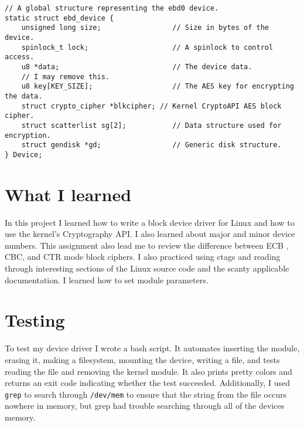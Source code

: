 \documentclass[10pt,conference,draftclsnofoot,onecolumn]{IEEEtran}
\begin{document}
\begin{lstlisting}
// A global structure representing the ebd0 device.
static struct ebd_device {
    unsigned long size;                 // Size in bytes of the device.
    spinlock_t lock;                    // A spinlock to control access.
    u8 *data;                           // The device data.
    // I may remove this.
    u8 key[KEY_SIZE];                   // The AES key for encrypting the data.
    struct crypto_cipher *blkcipher; // Kernel CryptoAPI AES block cipher.
    struct scatterlist sg[2];           // Data structure used for encryption.
    struct gendisk *gd;                 // Generic disk structure.
} Device;
\end{lstlisting}


\section{What I learned}
In this project I learned how to write a block device driver for Linux and how to use the kernel's Cryptography API. I also learned about major and minor device numbers. This assignment also lead me to review the difference between ECB , CBC, and CTR mode block ciphers. I also practiced using ctags and reading through interesting sections of the Linux source code and the scanty applicable documentation. I learned how to set module parameters.

\section{Testing}
To test my device driver I wrote a bash script. It automates inserting the module, erasing it, making a filesystem, mounting the device, writing a file, and tests reading the file and removing the kernel module. It also prints pretty colors and returns an exit code indicating whether the test succeeded. Additionally, I used \texttt{grep} to search through \texttt{/dev/mem} to ensure that the string from the file occurs nowhere in memory, but grep had trouble searching through all of the devices memory.
\end{document}
